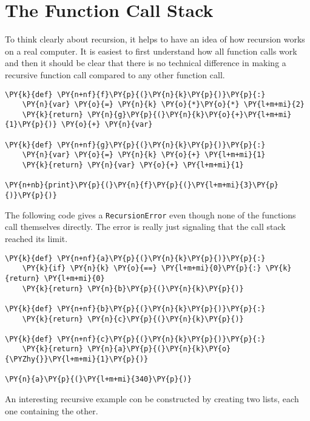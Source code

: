\section{The Function Call Stack}


To think clearly about recursion, it helps to have an idea of how recursion works on a real computer.
It is easiest to first understand how all function calls work and then it should be clear that there is no technical difference in making a recursive function call compared to any other function call.

\begin{Verbatim}[commandchars=\\\{\}]
\PY{k}{def} \PY{n+nf}{f}\PY{p}{(}\PY{n}{k}\PY{p}{)}\PY{p}{:}
    \PY{n}{var} \PY{o}{=} \PY{n}{k} \PY{o}{*}\PY{o}{*} \PY{l+m+mi}{2}
    \PY{k}{return} \PY{n}{g}\PY{p}{(}\PY{n}{k}\PY{o}{+}\PY{l+m+mi}{1}\PY{p}{)} \PY{o}{+} \PY{n}{var}

\PY{k}{def} \PY{n+nf}{g}\PY{p}{(}\PY{n}{k}\PY{p}{)}\PY{p}{:}
    \PY{n}{var} \PY{o}{=} \PY{n}{k} \PY{o}{+} \PY{l+m+mi}{1}
    \PY{k}{return} \PY{n}{var} \PY{o}{+} \PY{l+m+mi}{1}

\PY{n+nb}{print}\PY{p}{(}\PY{n}{f}\PY{p}{(}\PY{l+m+mi}{3}\PY{p}{)}\PY{p}{)}
\end{Verbatim}



The following code gives a \texttt{RecursionError} even though none of the functions call themselves directly.
The error is really just signaling that the call stack reached its limit.

\begin{Verbatim}[commandchars=\\\{\}]
\PY{k}{def} \PY{n+nf}{a}\PY{p}{(}\PY{n}{k}\PY{p}{)}\PY{p}{:}
    \PY{k}{if} \PY{n}{k} \PY{o}{==} \PY{l+m+mi}{0}\PY{p}{:} \PY{k}{return} \PY{l+m+mi}{0}
    \PY{k}{return} \PY{n}{b}\PY{p}{(}\PY{n}{k}\PY{p}{)}

\PY{k}{def} \PY{n+nf}{b}\PY{p}{(}\PY{n}{k}\PY{p}{)}\PY{p}{:}
    \PY{k}{return} \PY{n}{c}\PY{p}{(}\PY{n}{k}\PY{p}{)}

\PY{k}{def} \PY{n+nf}{c}\PY{p}{(}\PY{n}{k}\PY{p}{)}\PY{p}{:}
    \PY{k}{return} \PY{n}{a}\PY{p}{(}\PY{n}{k}\PY{o}{\PYZhy{}}\PY{l+m+mi}{1}\PY{p}{)}

\PY{n}{a}\PY{p}{(}\PY{l+m+mi}{340}\PY{p}{)}
\end{Verbatim}



An interesting recursive example con be constructed by creating two lists, each one containing the other.

